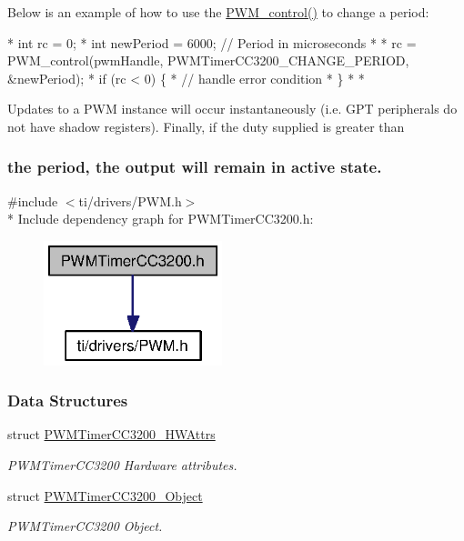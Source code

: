 Below is an example of how to use the \hyperlink{_p_w_m_8h_ade999f5b12997479efa1ac85aaf46ef5}{P\-W\-M\-\_\-control()} to change a period\-:


\begin{DoxyCode}
* \textcolor{keywordtype}{int} rc = 0;
* \textcolor{keywordtype}{int} newPeriod = 6000;   \textcolor{comment}{// Period in microseconds}
*
* rc = PWM_control(pwmHandle, PWMTimerCC3200_CHANGE_PERIOD, &newPeriod);
* \textcolor{keywordflow}{if} (rc < 0) \{
*   \textcolor{comment}{// handle error condition}
* \}
*
* 
\end{DoxyCode}


Updates to a P\-W\-M instance will occur instantaneously (i.\-e. G\-P\-T peripherals do not have shadow registers). Finally, if the duty supplied is greater than \subsubsection*{the period, the output will remain in active state. }{\ttfamily \#include $<$ti/drivers/\-P\-W\-M.\-h$>$}\\*
Include dependency graph for P\-W\-M\-Timer\-C\-C3200.\-h\-:
\nopagebreak
\begin{figure}[H]
\begin{center}
\leavevmode
\includegraphics[width=147pt]{_p_w_m_timer_c_c3200_8h__incl}
\end{center}
\end{figure}
\subsubsection*{Data Structures}
\begin{DoxyCompactItemize}
\item 
struct \hyperlink{struct_p_w_m_timer_c_c3200___h_w_attrs}{P\-W\-M\-Timer\-C\-C3200\-\_\-\-H\-W\-Attrs}
\begin{DoxyCompactList}\small\item\em P\-W\-M\-Timer\-C\-C3200 Hardware attributes. \end{DoxyCompactList}\item 
struct \hyperlink{struct_p_w_m_timer_c_c3200___object}{P\-W\-M\-Timer\-C\-C3200\-\_\-\-Object}
\begin{DoxyCompactList}\small\item\em P\-W\-M\-Timer\-C\-C3200 Object. \end{DoxyCompactList}\end{DoxyCompactItemize}
